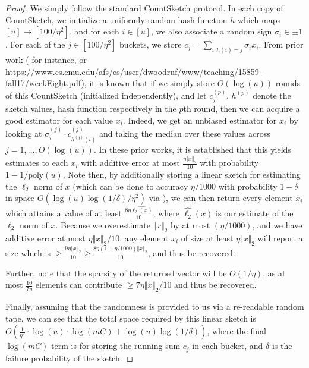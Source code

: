 \documentclass{article}
\begin{document}
\begin{proof}
    We simply follow the standard CountSketch protocol. In each copy of CountSketch, we initialize a uniformly random hash function $h$ which maps $[u] \rightarrow [100 / \eta^2]$, and for each $i \in [u]$, we also associate a random sign $\sigma_i \in \pm 1$. For each of the $j \in [100 / \eta^2]$ buckets, we store $c_j = \sum_{i: h(i) = j} \sigma_i x_i$. From prior work (\cite{JW18} for instance, or \url{https://www.cs.cmu.edu/afs/cs/user/dwoodruf/www/teaching/15859-fall17/weekEight.pdf}), it is known that if we simply store $O(\log(u))$ rounds of this CountSketch (initialized independently), and let $c_j^{(p)}$, $h^{(p)}$ denote the sketch values, hash function respectively in the $p$th round, then we can acquire a good estimator for each value $x_i$. Indeed, we get an unbiased estimator for $x_i$ by looking at $\sigma_i^{(j)} \cdot c_{h^{(j)}(i)}^{(j)}$ and taking the median over these values across $j = 1, \dots, O(\log(u))$. In these prior works, it is established that this yields estimates to each $x_i$ with additive error at most $\frac{\eta \Vert x \Vert_2}{10}$ with probability $1 - 1 / \text{poly}(u)$. Note then, by additionally storing a linear sketch for estimating the $\ell_2$ norm of $x$ (which can be done to accuracy $\eta / 1000$ with probability $1 - \delta$ in space $O(\log(u)\log(1 / \delta) / \eta^2 )$ via \cite{AMS96}), we can then return every element $x_i$ which attains a value of at least $\frac{8 \eta \hat{\ell_2(x)}}{10}$, where $\hat{\ell_2}(x)$ is our estimate of the $\ell_2$ norm of $x$. Because we overestimate $\Vert x \Vert_2$ by at most $(\eta / 1000)$, and we have additive error at most $\eta \Vert x \Vert_2 / 10$, any element $x_i$ of size at least $\eta \Vert x \Vert_2$ will report a size which is $\geq \frac{9 \eta \Vert x \Vert_2}{10} \geq \frac{8 \eta (1  + \eta / 1000)\Vert x \Vert_2 }{10}$, and thus be recovered. 

    Further, note that the sparsity of the returned vector will be $O(1 / \eta)$, as at most $\frac{10}{7 \eta}$ elements can contribute $\geq 7 \eta \Vert x \Vert_2 / 10$ and thus be recovered. 

    Finally, assuming that the randomness is provided to us via a re-readable random tape, we can see that the total space required by this linear sketch is $O(\frac{1}{\eta^2} \cdot \log(u) \cdot \log(mC) + \log(u) \log(1 / \delta))$, where the final $\log(mC)$ term is for storing the running sum $c_j$ in each bucket, and $\delta$ is the failure probability of the \cite{AMS96} sketch.
\end{proof}
\end{document}
